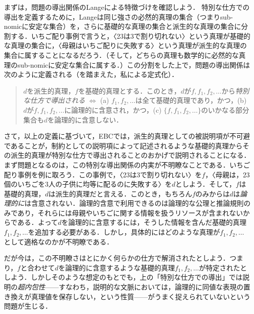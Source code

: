 \documentclass[dvipdfmx,twoside,11pt,uplatex]{jsarticle}
\theoremstyle{definition}
\begin{document}
まずは，問題の導出関係のLangeによる特徴づけを確認しよう．%
特別な仕方での導出を定義するために，Langeは同じ強さの必然的真理の集合（つまりsub-nomicに安定な集合）を，さらに基礎的な真理の集合と派生的な真理の集合に分割する\citep[27]{Lange2018bwcsum}．いちご配り事例で言うと，〈23は3で割り切れない〉という真理が基礎的な真理の集合に，〈母親はいちご配りに失敗する〉という真理が派生的な真理の集合に属することになるだろう．（そして，どちらの真理も数学的に必然的な真理のsub-nomicに安定な集合に属する．）この分割をした上で，問題の導出関係は次のように定義される（\citet[28--33]{Lange2018bwcsum}を踏まえた，私による定式化）．
\begin{quote}
    $d$を派生的真理，$f$を基礎的真理とする．このとき，$d$が$f, f_1, f_2, \ldots$から\emph{特別な仕方で導出される} $\Longleftrightarrow$ (a) $f_1, f_2, \ldots$は全て基礎的真理であり，かつ，(b) $d$が$f, f_1, f_2, \ldots$に論理的に含意され，かつ，(c) $\{f, f_1, f_2, \ldots\}$のいかなる部分集合も$d$を論理的に含意しない．
\end{quote}

さて，以上の定義に基づいて，EBCでは，派生的真理としての被説明項が不可避であることが，制約としての説明項によって記述されるような基礎的真理からその派生的真理が特別な仕方で導出されることのおかげで説明されることになる．まず問題となるのは，この特別な導出関係の内実が不明瞭なことである．いちご配り事例を例に取ろう．この事例で，〈23は3で割り切れない〉を$f$，〈母親は，23個のいちごを3人の子供に均等に配るのに失敗する〉を$d$としよう．そして，$f$は基礎的真理，$d$は派生的真理だと言える．このとき，もちろん$f$のみからは$d$は\emph{論理的に}は含意されない．論理的含意で利用できるのは論理的な公理と推論規則のみであり，それらには母親やいちごに関する情報を扱うリソースが含まれないからである．よって$d$を論理的に含意するには，そうした情報を含んだ基礎的真理$f_1, f_2, \ldots$を追加する必要がある．しかし，具体的にはどのような真理が$f_1, f_2, \ldots$として適格なのかが不明瞭である．%

だが今は，この不明瞭さはとにかく何らかの仕方で解消されたとしよう．つまり，$f$と合わせて$d$を論理的に含意するような基礎的真理$f_1, f_2, \ldots$が特定されたとしよう．しかしそのような想定のもとでも，上の「特別な仕方での導出」では説明の\emph{超内包性}------すなわち，説明的な文脈においては，論理的に同値な表現の置き換えが真理値を保存しない，という性質------がうまく捉えられていないという問題が生じる．
\end{document}
